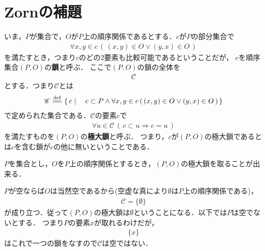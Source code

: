 \section{Zornの補題}
	いま，$P$が集合で，$O$が$P$上の順序関係であるとする．$c$が$P$の部分集合で
	\begin{align}
		\forall x,y \in c\, (\, (x,y) \in O \vee (y,x) \in O\, )
	\end{align}
	を満たすとき，つまり$c$のどの$2$要素も比較可能であるということだが，
	$c$を順序集合$(P,O)$の{\bf 鎖}と呼ぶ．
	ここで$(P,O)$の鎖の全体を
	\begin{align}
		\mathscr{C}
	\end{align}
	とする．つまり$\mathscr{C}$とは
	\begin{align}
		\mathscr{C} \defeq \Set{c}{c \subset P \wedge \forall x,y \in c\, (\, (x,y) \in O \vee (y,x) \in O\, )}
	\end{align}	
	で定められた集合である．$\mathscr{C}$の要素$c$で
	\begin{align}
		\forall u \in \mathscr{C}\, (\, c \subset u \Longrightarrow c=u\, )
	\end{align}
	を満たすものを$(P,O)$の{\bf 極大鎖}と呼ぶ．
	つまり，$c$が$(P,O)$の極大鎖であるとは$c$を含む鎖が$c$の他に無いということである．
	
	\begin{screen}
		\begin{thm}[極大鎖は必ず存在する]
		\label{thm:existence_of_maximal_chain}
			$P$を集合とし，$O$を$P$上の順序関係とするとき，$(P,O)$の極大鎖を取ることが出来る．
		\end{thm}
	\end{screen}
	
	$P$が空ならば$O$は当然空であるから(空虚な真により$\emptyset$は$P$上の順序関係である)，
	\begin{align}
		\mathscr{C} = \{\emptyset\}
	\end{align}
	が成り立つ．従って$(P,O)$の極大鎖は$\emptyset$ということになる．以下では$P$は空でないとする．
	つまり$P$の要素$x$が取れるわけだが，
	\begin{align}
		\{x\}
	\end{align}
	はこれで一つの鎖をなすので$\mathscr{C}$は空ではない．
	
